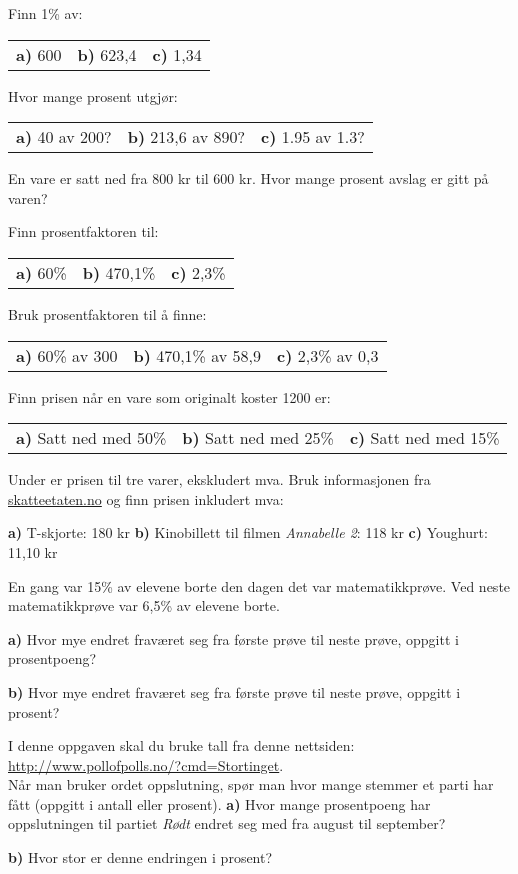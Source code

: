 



\opgt
{}
Finn 1\% av:\os
\begin{tabular}{@{}l l l}	
\textbf{a)} 600 &\textbf{b)} 623,4 &\textbf{c)}  1,34	
\end{tabular}
\nes

Hvor mange prosent utgjør:\os
\begin{tabular}{@{}l l l}	
\textbf{a)} 40 av 200? &
\textbf{b)} 213,6 av 890? &
\textbf{c)} 1.95 av 1.3?
\end{tabular}

En vare er satt ned fra 800 kr til 600 kr. Hvor mange prosent avslag er gitt på varen?

\nes
{}
Finn prosentfaktoren til:\os
\begin{tabular}{@{}l l l}	
	\textbf{a)} 60\% &\textbf{b)} 470,1\% &\textbf{c)}  2,3\%	
\end{tabular}

Bruk prosentfaktoren til å finne:\os
\begin{tabular}{@{}l l l}	
	\textbf{a)} 60\% av 300&\textbf{b)} 470,1\% av 58,9 &\textbf{c)}  2,3\%	av 0,3
\end{tabular}

\nes
{}
Finn prisen når en vare som originalt koster 1200 er:\os
\begin{tabular}{@{}l l l}	
	\textbf{a)} Satt ned med 50\%&
	\textbf{b)} Satt ned med 25\% &
	\textbf{c)} Satt ned med 15\%
\end{tabular}

Under er prisen til tre varer, ekskludert mva.
Bruk informasjonen fra \href{http://www.skatteetaten.no/no/Bedrift-og-organisasjon/avgifter/merverdiavgift/}{\color{blue} skatteetaten.no} og finn prisen inkludert mva:\os

\textbf{a)} T-skjorte: 180 kr\os
\textbf{b)} Kinobillett til filmen \textit{\textsl{Annabelle 2}}: 118 kr \os
\textbf{c)} Youghurt: 11,10 kr

\nes
\newpage
{}
En gang var 15\% av elevene borte den dagen det var matematikkprøve. Ved neste matematikkprøve var 6,5\% av elevene borte. \os

\textbf{a)} Hvor mye endret fraværet seg fra første prøve til neste prøve, oppgitt i prosentpoeng?\os

\textbf{b)} Hvor mye endret fraværet seg fra første prøve til neste prøve, oppgitt i prosent?\os

I denne oppgaven skal du bruke tall fra denne nettsiden:\\
{\color{blue}\url{http://www.pollofpolls.no/?cmd=Stortinget}}.\\ Når man bruker ordet oppslutning, spør man hvor mange stemmer et parti har fått (oppgitt i antall eller prosent). \os
\textbf{a)} Hvor mange prosentpoeng har oppslutningen til partiet \textsl{Rødt} endret seg med fra august til september?\os

\textbf{b)} Hvor stor er denne endringen i prosent?


